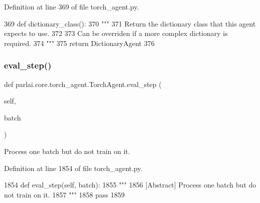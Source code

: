 Definition at line 369 of file torch\+\_\+agent.\+py.


\begin{DoxyCode}
369     \textcolor{keyword}{def }dictionary\_class():
370         \textcolor{stringliteral}{"""}
371 \textcolor{stringliteral}{        Return the dictionary class that this agent expects to use.}
372 \textcolor{stringliteral}{}
373 \textcolor{stringliteral}{        Can be overriden if a more complex dictionary is required.}
374 \textcolor{stringliteral}{        """}
375         \textcolor{keywordflow}{return} DictionaryAgent
376 
\end{DoxyCode}
\mbox{\label{classparlai_1_1core_1_1torch__agent_1_1TorchAgent_a18de0a52aeec4ef721aedbdd6ac06cad}} 
\subsubsection{\texorpdfstring{eval\+\_\+step()}{eval\_step()}}
{\footnotesize\ttfamily def parlai.\+core.\+torch\+\_\+agent.\+Torch\+Agent.\+eval\+\_\+step (\begin{DoxyParamCaption}\item[{}]{self,  }\item[{}]{batch }\end{DoxyParamCaption})}

\begin{DoxyVerb}[Abstract] Process one batch but do not train on it.
\end{DoxyVerb}
 

Definition at line 1854 of file torch\+\_\+agent.\+py.


\begin{DoxyCode}
1854     \textcolor{keyword}{def }eval\_step(self, batch):
1855         \textcolor{stringliteral}{"""}
1856 \textcolor{stringliteral}{        [Abstract] Process one batch but do not train on it.}
1857 \textcolor{stringliteral}{        """}
1858         \textcolor{keywordflow}{pass}
1859 
\end{DoxyCode}
\mbox{\label{classparlai_1_1core_1_1torch__agent_1_1TorchAgent_a0bd9118252c602bb9d5a596ecae16717}} 
